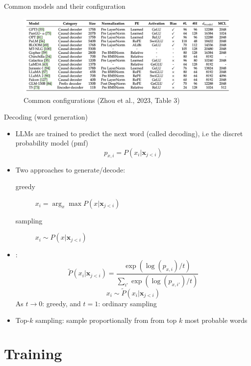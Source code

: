 \documentclass[10pt]{beamer}
\begin{document}
\begin{frame}{Common models and their configuration}

\begin{figure}[h]
\centering
\includegraphics[width=0.99\textwidth]{fig/zhou_2023_tab3}
\caption{Common configurations (Zhou et al., 2023, Table 3)}
\end{figure}

\end{frame}


\begin{frame}{Decoding (word generation)}

\begin{itemize}
\item LLMs are trained to predict the next word (called decoding), i.e the discret probability model (pmf)
\[
p_{x,i} = P(x_i|\mathbf{x}_{j<i})
\]
\pause
\item Two approaches to generate/decode:
\begin{description}
\item[greedy] $x_i = \arg_x \max P(x|\mathbf{x}_{j<i})$
\item[sampling] $x_i \sim P(x|\mathbf{x}_{j<i})$
\end{description}
\pause
\item {}:
\[
\tilde{P}(x_i|\mathbf{x}_{j<i}) = \frac{\exp(\log(p_{x,i})/t)}{\sum_{i'} \exp(\log(p_{x,i'})/t)}
\]
\[
x_i \sim \tilde{P}(x_i|\mathbf{x}_{j<i})
\]
As $t\rightarrow 0$: greedy, and $t = 1$: ordinary sampling
\pause
\item Top-$k$ sampling: sample proportionally from from top $k$ most probable words
\end{itemize}

\end{frame}



\section{Training}
\end{document}
